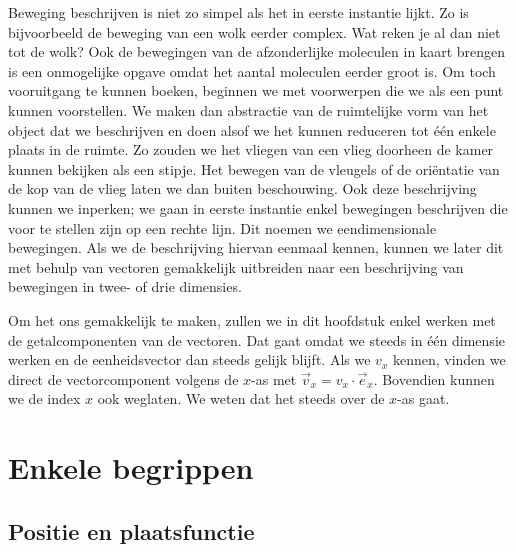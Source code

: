 \documentclass{ximera}
\begin{document}
	\author{Bart Lambregs}


	Beweging beschrijven is niet zo simpel als het in eerste instantie lijkt. Zo is bijvoorbeeld de beweging van een wolk eerder complex. Wat reken je al dan niet tot de wolk? Ook de bewegingen van de afzonderlijke moleculen in kaart brengen is een onmogelijke opgave omdat het aantal moleculen eerder groot is. Om toch vooruitgang te kunnen boeken, beginnen we met voorwerpen die we als een punt kunnen voorstellen. We maken dan abstractie van de ruimtelijke vorm van het object dat we beschrijven en doen alsof we het kunnen reduceren tot \'e\'en enkele plaats in de ruimte. Zo zouden we het vliegen van een vlieg doorheen de kamer kunnen bekijken als een stipje. Het bewegen van de vleugels of de ori\"entatie van de kop van de vlieg laten we dan buiten beschouwing. Ook deze beschrijving kunnen we inperken; we gaan in eerste instantie enkel bewegingen beschrijven die voor te stellen zijn op een rechte lijn. Dit noemen we eendimensionale bewegingen. Als we de beschrijving hiervan eenmaal kennen, kunnen we later dit met behulp van vectoren gemakkelijk uitbreiden naar een beschrijving van bewegingen in twee- of drie dimensies.
	
	Om het ons gemakkelijk te maken, zullen we in dit hoofdstuk enkel werken met de getalcomponenten van de vectoren. Dat gaat omdat we steeds in \'e\'en dimensie werken en de eenheidsvector dan steeds gelijk blijft. Als we $v_x$ kennen, vinden we direct de vectorcomponent volgens de $x$-as met $\vec{v}_x=v_x\cdot\vec{e}_x$. Bovendien kunnen we de index $x$ ook weglaten. We weten dat het steeds over de $x$-as gaat.
	
	

	
	\section{Enkele begrippen}
	\subsection{Positie en plaatsfunctie}
	
\end{document}
